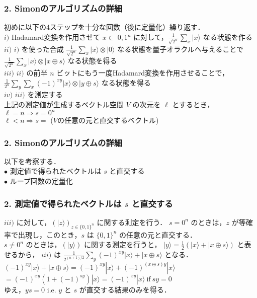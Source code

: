\documentclass[dvipdfmx,12pt]{beamer}%
\begin{document}
\begin{frame}

\frametitle{2. Simonのアルゴリズムの詳細}
                  
初めに以下の4ステップを十分な回数（後に定量化）繰り返す． \\
$i)$  Hadamard変換を作用させて $ x \in $ {$ 0, 1 $}$^n$ に対して，$ \displaystyle \frac{1}{\sqrt{2^n}} \sum_x | x \rangle $ なる状態を作る  \\
$ii)$  $i)$ を使った合成 $ \displaystyle \frac{1}{\sqrt{2^n}} \sum_x | x \rangle \otimes | 0 \rangle $ なる状態を量子オラクルへ与えることで $ \displaystyle \frac{1}{\sqrt{2^n}} \sum_x | x \rangle \otimes | x \oplus s \rangle $ なる状態を得る \\
$iii)$ $ii)$ の前半 $n$ ビットにもう一度Hadamard変換を作用させることで，$ \displaystyle \frac{1}{2^n} \sum_y \sum_x (-1)^{xy} | x \rangle \otimes | y \oplus s \rangle $ なる状態を得る \\
$iv)$ $iii)$ を測定する \\
  
上記の測定値が生成するベクトル空間 $V$ の次元を $ \ell $ とするとき，\\
$ \ell = n \Rightarrow s = 0^n $ \\
$ \ell < n \Rightarrow s = $ ($V$の任意の元と直交するベクトル)

\end{frame}


\begin{frame}

\frametitle{2. Simonのアルゴリズムの詳細}
                      
以下を考察する． \\
$ \bullet $ 測定値で得られたベクトルは $s$ と直交する \\
$ \bullet $ ループ回数の定量化
    
\end{frame}


\begin{frame}

\frametitle{2. 測定値で得られたベクトルは $s$ と直交する}
                          
$iii)$ に対して，$ (| z \rangle)_{z \in \{ 0, 1 \}^n } $ に関する測定を行う．
$ s = 0^n $ のときは，$z$ が等確率で出現し，このとき，$s$ は $ \{ 0, 1 \}^n $ の任意の元と直交する．\\
$ s \neq 0^n $ のときは，$(| y \rangle)$ に関する測定を行うと，
$ \displaystyle | y \rangle = \frac{1}{2} ( | x \rangle + | x \oplus s \rangle ) $ と表せるから，
$iii)$ は $ \displaystyle \frac{1}{2^{(n + 1)/2}} \sum_y (-1)^{xy} | x \rangle + | x \oplus s \rangle $ となる．\\
$ (-1)^{xy} | x \rangle + | x \oplus s \rangle = (-1)^{xy} | x \rangle + (-1)^{(x \oplus s)y} | x \rangle $  
$ = (-1)^{xy} (1 + (-1)^{sy} ) | x \rangle = (-1)^{xy} | x \rangle \ \mathrm{if} \ sy = 0 $ \\
        
ゆえ，$ ys = 0 $ i.e. $ y $ と $s$ が直交する結果のみを得る．

\end{frame}
\end{document}
